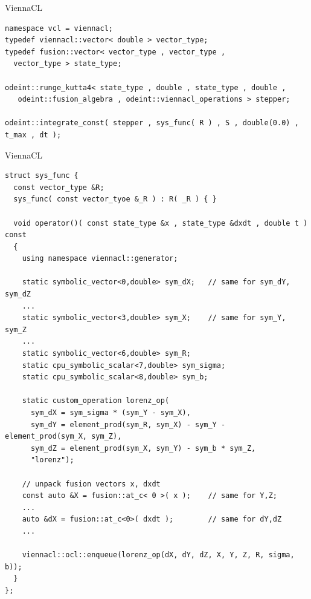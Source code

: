 \documentclass{beamer}
\newcommand{\heading}[1]{\centerline{\Large #1} \vspace{0.5em}}
\begin{document}
\begin{frame}[fragile]
 \heading{ViennaCL}

\begin{lstlisting}[basicstyle=\tiny\ttfamily]
namespace vcl = viennacl;
typedef viennacl::vector< double > vector_type;
typedef fusion::vector< vector_type , vector_type ,
  vector_type > state_type;

odeint::runge_kutta4< state_type , double , state_type , double ,
   odeint::fusion_algebra , odeint::viennacl_operations > stepper;

odeint::integrate_const( stepper , sys_func( R ) , S , double(0.0) , t_max , dt );
\end{lstlisting}

\end{frame}


\begin{frame}[fragile]
 \heading{ViennaCL}

\begin{lstlisting}[basicstyle=\tiny\ttfamily]
struct sys_func {
  const vector_type &R;
  sys_func( const vector_tyoe &_R ) : R( _R ) { }

  void operator()( const state_type &x , state_type &dxdt , double t ) const
  {
    using namespace viennacl::generator;

    static symbolic_vector<0,double> sym_dX;   // same for sym_dY, sym_dZ
    ... 
    static symbolic_vector<3,double> sym_X;    // same for sym_Y, sym_Z
    ... 
    static symbolic_vector<6,double> sym_R;
    static cpu_symbolic_scalar<7,double> sym_sigma;
    static cpu_symbolic_scalar<8,double> sym_b;

    static custom_operation lorenz_op(
      sym_dX = sym_sigma * (sym_Y - sym_X),
      sym_dY = element_prod(sym_R, sym_X) - sym_Y - element_prod(sym_X, sym_Z),
      sym_dZ = element_prod(sym_X, sym_Y) - sym_b * sym_Z,
      "lorenz");

    // unpack fusion vectors x, dxdt
    const auto &X = fusion::at_c< 0 >( x );    // same for Y,Z;
    ...
    auto &dX = fusion::at_c<0>( dxdt );        // same for dY,dZ
    ...

    viennacl::ocl::enqueue(lorenz_op(dX, dY, dZ, X, Y, Z, R, sigma, b));
  }
};
\end{lstlisting}

\end{frame}
\end{document}

